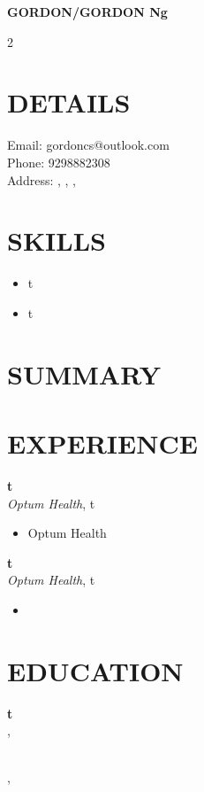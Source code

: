 \documentclass[11pt,a4paper]{article}
\begin{document}
\noindent
{\Huge\bfseries GORDON/GORDON Ng}\hfill{\large\color{graytext} }

\vspace{20pt}

\begin{multicols}{2}

\begin{tcolorbox}[sidebarstyle]
\section*{DETAILS}
Email: gordoncs@outlook.com \\[2pt]
Phone: 9298882308 \\[2pt]
Address: , ,  , 

\vspace{12pt}
\section*{SKILLS}
\begin{itemize}
  \item t
  \item t
\end{itemize}
\end{tcolorbox}

\columnbreak
\section*{SUMMARY}


\vspace{12pt}
\section*{EXPERIENCE}
\textbf{t}\\
\textit{Optum Health}, t \hfill 
\begin{itemize}
  \item Optum Health
\end{itemize}
\vspace{18pt}
\textbf{t}\\
\textit{Optum Health}, t \hfill 
\begin{itemize}
  \item 
\end{itemize}
\vspace{18pt}


\vspace{12pt}
\section*{EDUCATION}
\textbf{t} \hfill \\
, 

\textbf{} \hfill \\
, 



\end{multicols}
\end{document}
